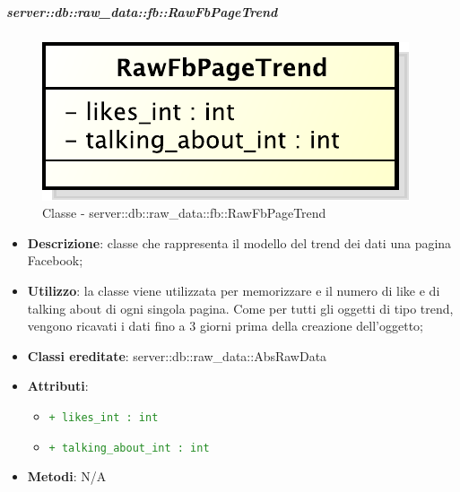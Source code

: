 			\subparagraph{server::db::raw\_data::fb::RawFbPageTrend} %
			\label{subp:server_db_raw_data_fb_rowfbpagetrend}
				\begin{figure}[htbp]
					\centering
					\centerline{\includegraphics[scale=0.75]{./images/server/classes/db/raw_fb_page_trend.pdf}}
					\caption{Classe - server::db::raw\_data::fb::RawFbPageTrend}
				\end{figure}
				\begin{itemize}
					\item \textbf{Descrizione}: classe che rappresenta il modello del trend dei dati una pagina Facebook;
					\item \textbf{Utilizzo}: la classe viene utilizzata per memorizzare e il numero di like e di talking about di ogni singola pagina. Come per tutti gli oggetti di tipo trend, vengono ricavati i dati fino a 3 giorni prima della creazione dell'oggetto;
					\item \textbf{Classi ereditate}: server::db::raw\_data::AbsRawData
					\item \textbf{Attributi}:
					\begin{itemize}
						\item \textcolor{forestgreen}{\texttt{+ likes\_int : int}}
						\item \textcolor{forestgreen}{\texttt{+ talking\_about\_int : int}}
					\end{itemize}
					\item \textbf{Metodi}: N/A
				\end{itemize}


